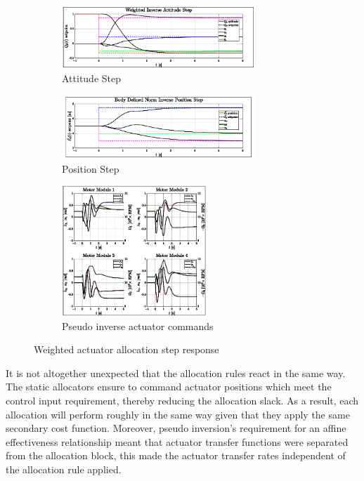 \begin{figure}[hbtp]
\centering
\begin{subfigure}{\textwidth}
\centering
\includegraphics[width=0.8\textwidth]{graphs/weighted_inverse_attitude}
\vspace{-12pt}
\caption{Attitude Step}
\label{fig:weighted_inverse_attitude}
\end{subfigure}
\begin{subfigure}{\textwidth}
\centering
\includegraphics[width=0.8\textwidth]{graphs/body_norm_position}
\vspace{-2pt}
\caption{Position Step}
\label{fig:weighted_inverse_position}
\end{subfigure}
\vspace{-8pt}
\begin{subfigure}{\textwidth}
\centering
\includegraphics[width=0.6\textwidth]{graphs/body_norm_input}
\caption{Pseudo inverse actuator commands}
\label{fig:weighted_inverse_input}
\end{subfigure}
\caption{Weighted actuator allocation step response}
\label{fig:weighted-inverse-step}
\vspace{-16pt}
\end{figure}
\par
It is not altogether unexpected that the allocation rules react in the same way. The static allocators ensure to command actuator positions which meet the control input requirement, thereby reducing the allocation slack. As a result, each allocation will perform roughly in the same way given that they apply the same secondary cost function. Moreover, pseudo inversion's requirement for an affine effectiveness relationship meant that actuator transfer functions were separated from the allocation block, this made the actuator transfer rates independent of the allocation rule applied.
